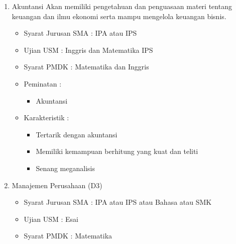 \documentclass[a4paper,twoside]{article}
\begin{document}
\begin{enumerate}
\begin{enumerate}
\begin{enumerate}
				\item Akuntansi
					Akan memiliki pengetahuan dan penguasaan materi tentang keuangan dan ilmu ekonomi serta mampu mengelola keuangan bisnis.				
					\begin{itemize}
						\item Syarat Jurusan SMA : IPA atau IPS
						\item Ujian USM : Inggris dan Matematika IPS
						\item Syarat PMDK : Matematika dan Inggris
						\item Peminatan :
						\begin{itemize}
							\item Akuntansi
						\end{itemize}
						\item Karakteristik :
						\begin{itemize}
							\item Tertarik dengan akuntansi
							\item Memiliki kemampuan berhitung yang kuat dan teliti
							\item Senang meganalisis
						\end{itemize}
					\end{itemize}
					
				\item Manajemen Perusahaan (D3)
				
					\begin{itemize}
						\item Syarat Jurusan SMA : IPA atau IPS atau Bahasa atau SMK
						\item Ujian USM : Esai
						\item Syarat PMDK : Matematika
					\end{itemize}
			\end{enumerate}
			

\end{enumerate}
\end{enumerate}
\end{document}
